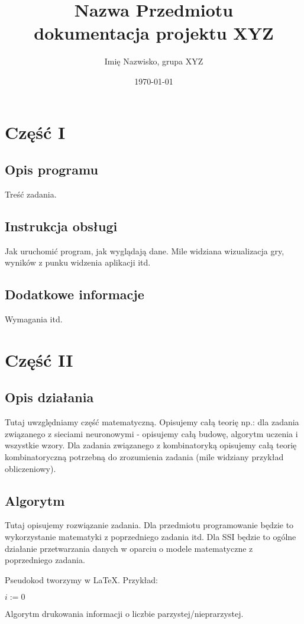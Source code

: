 \documentclass[12pt,a4paper]{article}
\begin{document}
	
	\title{Nazwa Przedmiotu\\\small{dokumentacja projektu XYZ}}
	\author{Imię Nazwisko, grupa XYZ}
	\date{\today}

	\maketitle
	\newpage
	\section*{Część I}
	\subsection*{Opis programu}
	Treść zadania.
	\subsection*{Instrukcja obsługi}
	Jak uruchomić program, jak wyglądają dane. Mile widziana wizualizacja gry, wyników z punku widzenia aplikacji itd. 
	\subsection*{Dodatkowe informacje}
	Wymagania itd.
	\newpage
	\section*{Część II}
	\subsection*{Opis działania} 
	Tutaj uwzględniamy część matematyczną. Opisujemy całą teorię np.:
	dla zadania związanego z sieciami neuronowymi - opisujemy całą budowę, algorytm uczenia i wszystkie wzory. Dla zadania związanego z kombinatoryką opisujemy całą teorię kombinatoryczną potrzebną do zrozumienia zadania (mile widziany przykład obliczeniowy).
	
	
	
	\subsection*{Algorytm}
	Tutaj opisujemy rozwiązanie zadania. Dla przedmiotu programowanie będzie to wykorzystanie matematyki z poprzedniego zadania itd. Dla SSI będzie to ogólne działanie przetwarzania danych w oparciu o modele matematyczne z poprzedniego zadania. 
	
	
	Pseudokod tworzymy w \LaTeX. Przykład:\\
	\begin{algorithm}[H]
		$i:=0$\;
		\caption{Algorytm drukowania informacji o liczbie parzystej/nieprarzystej.}
	\end{algorithm}
\end{document}
